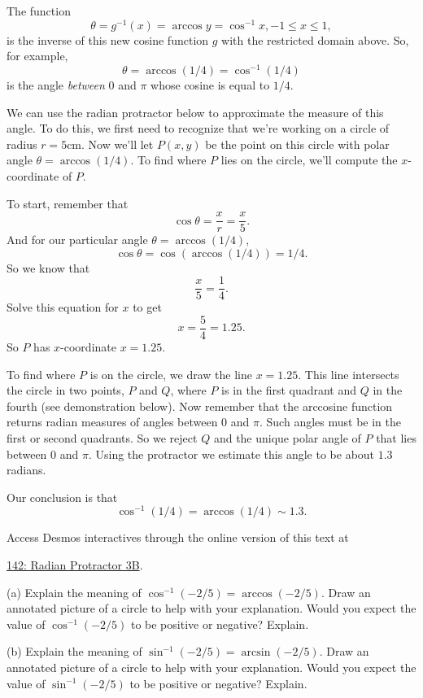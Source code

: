 \documentclass{ximera}
\begin{document}
\begin{exploration}  \label{Esdgtrhnh}
The function
\[
   \theta = g^{-1}(x) = \arccos y = \cos^{-1} x , -1\leq x \leq 1 ,
\]
is the inverse of this new cosine function $g$ with the restricted domain above. So, for example, 
\[
   \theta =  \arccos(1/4) = \cos^{-1}(1/4)
\]
is the angle \emph{between} $0$ and $\pi$ whose cosine is equal to $1/4$. 

We can use the radian protractor below to approximate the measure of this angle. 
To do this, we first need to recognize that we're working on a circle of radius $r=5$cm. Now we'll let $P(x,y)$ be the point on this circle with polar angle $\theta = \arccos(1/4)$. To find where $P$ lies on the circle, we'll compute the $x$-coordinate of $P$.

To start, remember that 
\[
      \cos \theta = \frac{x}{r} = \frac{x}{5}.
\]
And for our particular angle $\theta = \arccos(1/4)$,  
\[
   \cos \theta = \cos (\arccos(1/4)) = 1/4.
\]
So we know that 
\[
    \frac{x}{5} = \frac{1}{4} .
\] 
Solve this equation for $x$ to get 
\[
  x = \frac{5}{4} = 1.25 .
\]
So $P$ has $x$-coordinate $x=1.25$. 

To find where $P$ is on the circle, we draw the line $x=1.25$. This line intersects the circle in two points, $P$ and $Q$, where $P$ is in the first quadrant and $Q$ in the fourth (see demonstration below). Now remember that the arccosine function returns radian measures of angles between $0$ and $\pi$. Such angles must be in the first or second quadrants.  So we reject $Q$ and the unique polar angle of $P$ that lies between $0$ and $\pi$.  Using the protractor we estimate this angle to be about $1.3$ radians.

Our conclusion is that 
\[
   \cos^{-1}(1/4)  = \arccos(1/4) \sim 1.3.
\]


\begin{onlineOnly}
    \begin{center}
\end{center}
\end{onlineOnly}

Access Desmos interactives through the online version of this text at
 
\href{https://www.desmos.com/calculator/pzftbzlfkn}{142: Radian Protractor 3B}.

\end{exploration}




\begin{question} \label{Q5:Inverse}
(a) Explain the meaning of $\cos^{-1}(-2/5) = \arccos(-2/5)$. Draw an annotated picture of a circle to help with your explanation. Would you expect the value of $\cos^{-1}(-2/5)$ to be positive or negative? Explain.

(b)  Explain the meaning of $\sin^{-1}(-2/5) = \arcsin(-2/5)$. Draw an annotated picture of a circle to help with your explanation. Would you expect the value of $\sin^{-1}(-2/5)$ to be positive or negative? Explain.

\end{question}
\end{document}
